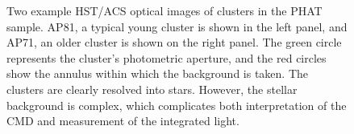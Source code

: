 \documentclass{emulateapj}
\begin{document}
\begin{figure}[!htbp]
\centering
\mbox{}
\caption{Two example HST/ACS optical images of clusters in the PHAT sample.  AP81, a typical young cluster is shown in the left panel, and AP71, an older cluster is shown on the right panel.  The green circle represents the cluster's photometric aperture, and the red circles show the annulus within which the background is taken.  The clusters are clearly resolved into stars.  However, the stellar background is complex, which complicates both interpretation of the CMD and measurement of the integrated light.}
\label{fig:images}
\end{figure}
\end{document}
